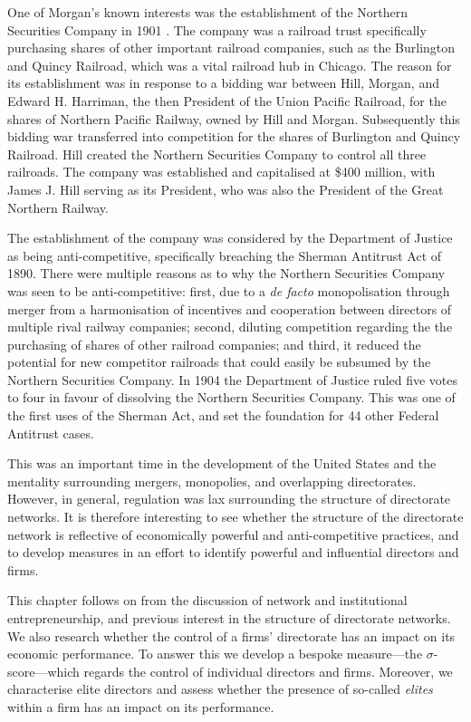 One of Morgan's known interests was the establishment of the Northern Securities Company in 1901
\citep{Langdell1903}. The company was a railroad trust specifically purchasing shares of other important railroad companies, such as the Burlington and Quincy Railroad, which was a vital railroad hub in Chicago. The reason for its establishment was in response to a bidding war between Hill, Morgan, and Edward H. Harriman, the then President of the Union Pacific Railroad, for the shares of Northern Pacific Railway, owned by Hill and Morgan. Subsequently this bidding war transferred into competition for the shares of Burlington and Quincy Railroad. Hill created the Northern Securities Company to control all three railroads. The company was established and capitalised at \$400 million, with James J. Hill serving as its President, who was also the President of the Great Northern Railway.

The establishment of the company was considered by the Department of Justice as being anti-competitive, specifically breaching the Sherman Antitrust Act of 1890. There were multiple reasons as to why the Northern Securities Company was seen to be anti-competitive: first, due to a \emph{de facto} monopolisation through merger from a harmonisation of incentives and cooperation between directors of multiple rival railway companies; second, diluting competition regarding the the purchasing of shares of other railroad companies; and third, it reduced the potential for new competitor railroads that could easily be subsumed by the Northern Securities Company. In 1904 the Department of Justice ruled five votes to four in favour of dissolving the Northern Securities Company. This was one of the first uses of the Sherman Act, and set the foundation for 44 other Federal Antitrust cases.

This was an important time in the development of the United States and the mentality surrounding mergers, monopolies, and overlapping directorates. However, in general, regulation was lax surrounding the structure of directorate networks. It is therefore interesting to see whether the structure of the directorate network is reflective of economically powerful and anti-competitive practices, and to develop measures in an effort to identify powerful and influential directors and firms.

\medskip\noindent This chapter follows on from the discussion of network and institutional entrepreneurship, and previous interest in the structure of directorate networks. We also research whether the control of a firms' directorate has an impact on its economic performance. To answer this we develop a bespoke measure---the $\sigma$-score---which regards the control of individual directors and firms. Moreover, we characterise elite directors and assess whether the presence of so-called \emph{elites} within a firm has an impact on its performance.

